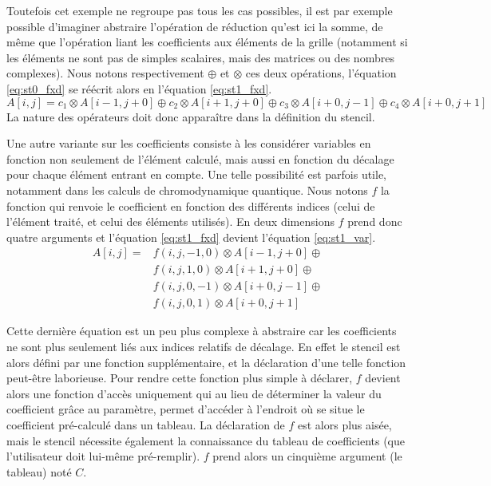 Toutefois cet exemple ne regroupe pas tous les cas possibles, il est par exemple possible d'imaginer abstraire l'opération de réduction qu'est ici la somme, de même que l'opération liant les coefficients aux éléments de la grille (notamment si les éléments ne sont pas de simples scalaires, mais des matrices ou des nombres complexes). Nous notons respectivement $\oplus$ et $\otimes$ ces deux opérations, l'équation \ref{eq:st0_fxd} se réécrit alors en l'équation \ref{eq:st1_fxd}.
\begin{equation}
\label{eq:st1_fxd}
A[i,j] = c_1 \otimes A[i-1,j+0] \oplus c_2 \otimes A[i+1,j+0] \oplus c_3 \otimes A[i+0,j-1] \oplus c_4 \otimes A[i+0,j+1]
\end{equation}
La nature des opérateurs doit donc apparaître dans la définition du stencil.

Une autre variante sur les coefficients consiste à les considérer variables en fonction non seulement de l'élément calculé, mais aussi en fonction du décalage pour chaque élément entrant en compte. Une telle possibilité est parfois utile, notamment dans les calculs de chromodynamique quantique. Nous notons $f$ la fonction qui renvoie le coefficient en fonction des différents indices (celui de l'élément traité, et celui des éléments utilisés). En deux dimensions $f$ prend donc quatre arguments et l'équation \ref{eq:st1_fxd} devient l'équation \ref{eq:st1_var}.
\begin{equation}
\label{eq:st1_var}
\begin{aligned}
A[i,j] = & f(i, j, -1,  0) \otimes A[i-1,j+0] \oplus \\
         & f(i, j,  1,  0) \otimes A[i+1,j+0] \oplus \\
         & f(i, j,  0, -1) \otimes A[i+0,j-1] \oplus \\ 
         & f(i, j,  0,  1) \otimes A[i+0,j+1]
\end{aligned}
\end{equation}

Cette dernière équation est un peu plus complexe à abstraire car les coefficients ne sont plus seulement liés aux indices relatifs de décalage. En effet le stencil est alors défini par une fonction supplémentaire, et la déclaration d'une telle fonction peut-être laborieuse. Pour rendre cette fonction plus simple à déclarer, $f$ devient alors une fonction d'accès uniquement qui au lieu de déterminer la valeur du coefficient grâce au paramètre, permet d'accéder à l'endroit où se situe le coefficient pré-calculé dans un tableau. La déclaration de $f$ est alors plus aisée, mais le stencil nécessite également la connaissance du tableau de coefficients (que l'utilisateur doit lui-même pré-remplir). $f$ prend alors un cinquième argument (le tableau) noté $C$.

